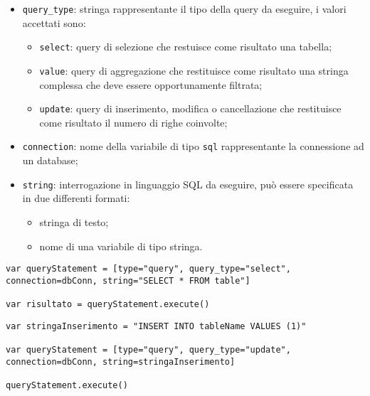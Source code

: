 \begin{itemize}
    \item \verb|query_type|: stringa rappresentante il tipo della query da eseguire, i valori accettati sono:
    \begin{itemize}
        \item \verb|select|: query di selezione che restuisce come risultato una tabella;
        \item \verb|value|: query di aggregazione che restituisce come risultato una stringa complessa che deve essere opportunamente filtrata;
        \item \verb|update|: query di inserimento, modifica o cancellazione che restituisce come risultato il numero di righe coinvolte;
    \end{itemize}
    \item \verb|connection|: nome della variabile di tipo \verb|sql| rappresentante la connessione ad un database;
    \item \verb|string|: interrogazione in linguaggio SQL da eseguire, può essere specificata in due differenti formati:
    \begin{itemize}
        \item stringa di testo;
        \item nome di una variabile di tipo stringa.
    \end{itemize}
\end{itemize}

\begin{lstlisting}[language=FLY,caption={Dichiarazione di entità query per l'esecuzione di un'interrogazione di selezione che utilizza una stringa di testo.}, label={lst:querySelect}]
var queryStatement = [type="query", query_type="select", connection=dbConn, string="SELECT * FROM table"]

var risultato = queryStatement.execute()
\end{lstlisting}

\begin{lstlisting}[language=FLY,caption={Dichiarazione di entità query per l'esecuzione di un'interrogazione di inserimento che utilizza una variabile di tipo stringa.}, label={lst:queryUpdate}]
var stringaInserimento = "INSERT INTO tableName VALUES (1)"

var queryStatement = [type="query", query_type="update", connection=dbConn, string=stringaInserimento]

queryStatement.execute()
\end{lstlisting}

